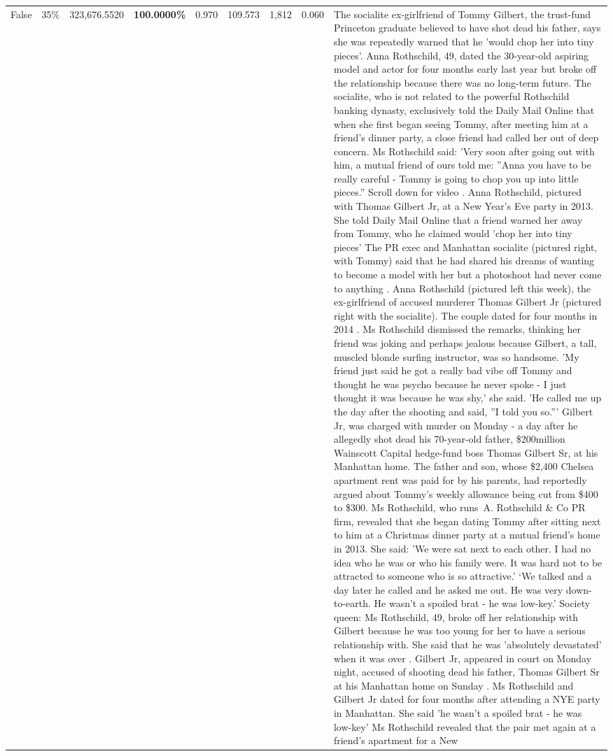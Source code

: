 \begin{table}[H]
\begin{tabular}{lllrlllll}
False & 35\% & 323,676.5520 & \bfseries \color{red} 100.0000\% & 0.970 & 109.573 & 1,812 & 0.060 & The socialite ex-girlfriend of Tommy Gilbert, the trust-fund Princeton graduate believed to have shot dead his father, says she was repeatedly warned that he 'would chop her into tiny pieces'. Anna Rothschild, 49, dated the 30-year-old aspiring model and actor for four months early last year but broke off the relationship because there was no long-term future. The socialite, who is not related to the powerful Rothschild banking dynasty, exclusively told the Daily Mail Online that when she first began seeing Tommy, after meeting him at a friend's dinner party, a close friend had called her out of deep concern. Ms Rothschild said: 'Very soon after going out with him, a mutual friend of ours told me: ''Anna you have to be really careful - Tommy is going to chop you up into little pieces.'' Scroll down for video . Anna Rothschild, pictured with Thomas Gilbert Jr, at a New Year's Eve party in 2013. She told Daily Mail Online that a friend warned her away from Tommy, who he claimed would 'chop her into tiny pieces' The PR exec and Manhattan socialite (pictured right, with Tommy) said that he had shared his dreams of wanting to become a model with her but a photoshoot had never come to anything . Anna Rothschild (pictured left this week), the ex-girlfriend of accused murderer Thomas Gilbert Jr (pictured right with the socialite). The couple dated for four months in 2014 . Ms Rothschild dismissed the remarks, thinking her friend was joking and perhaps jealous because Gilbert, a tall, muscled blonde surfing instructor, was so handsome. 'My friend just said he got a really bad vibe off Tommy and thought he was psycho because he never spoke - I just thought it was because he was shy,' she said. 'He called me up the day after the shooting and said, ''I told you so.''' Gilbert Jr, was charged with murder on Monday - a day after he allegedly shot dead his 70-year-old father, \$200million Wainscott Capital hedge-fund boss Thomas Gilbert Sr, at his Manhattan home. The father and son, whose \$2,400 Chelsea apartment rent was paid for by his parents, had reportedly argued about Tommy's weekly allowance being cut from \$400 to \$300. Ms Rothschild, who runs A. Rothschild \& Co PR firm, revealed that she began dating Tommy after sitting next to him at a Christmas dinner party at a mutual friend's home in 2013. She said: 'We were sat next to each other. I had no idea who he was or who his family were. It was hard not to be attracted to someone who is so attractive.' ‘We talked and a day later he called and he asked me out. He was very down-to-earth. He wasn’t a spoiled brat - he was low-key.’ Society queen: Ms Rothschild, 49, broke off her relationship with Gilbert because he was too young for her to have a serious relationship with. She said that he was 'absolutely devastated' when it was over . Gilbert Jr, appeared in court on Monday night, accused of shooting dead his father, Thomas Gilbert Sr at his Manhattan home on Sunday . Ms Rothschild and Gilbert Jr dated for four months after attending a NYE party in Manhattan. She said 'he wasn't a spoiled brat - he was low-key' Ms Rothschild revealed that the pair met again at a friend’s apartment for a New 
\end{tabular}
\end{table}
